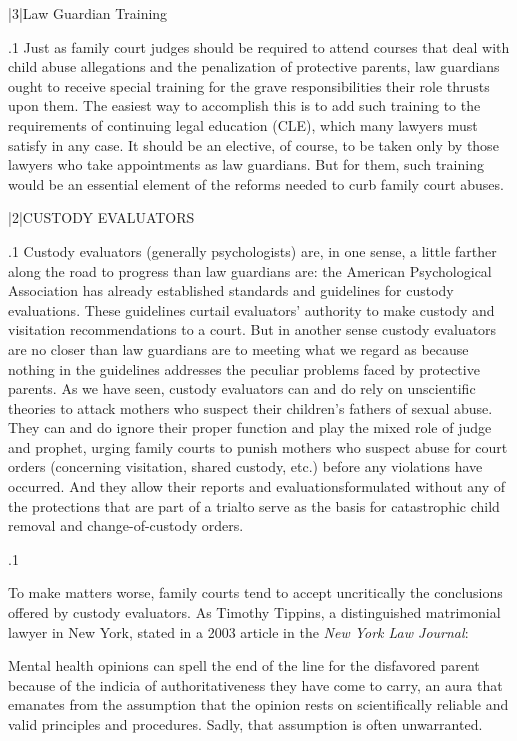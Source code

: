 \documentclass[11pt, twoside]{article}
\begin{document}
{\s|3|{Law Guardian Training}

\p.1{%
\noindent{}Just as family court judges should be required to attend courses that
deal with child abuse allegations and the penalization of protective
parents, law guardians ought to receive special training for the grave
responsibilities their role thrusts upon them. The easiest way to accomplish this is to add such training to the requirements of continuing
legal education (CLE), which many lawyers must satisfy in any case.
It should be an elective, of course, to be taken only by those lawyers
who take appointments as law guardians. But for them, such training
would be an essential element of the reforms needed to curb family court
abuses.
}%


\s|2|{CUSTODY EVALUATORS}

\p.1{%
\noindent{}Custody evaluators (generally psychologists) are, in one sense, a
little farther along the road to progress than law guardians are: the
American Psychological Association has already established standards
and guidelines for custody evaluations. These guidelines curtail evaluators’ authority to make custody and visitation recommendations to a
court. But in another sense custody evaluators are no closer than law
guardians are to meeting what we regard as  because nothing in the guidelines addresses the peculiar problems
faced by protective parents. As we have seen, custody evaluators can
and do rely on unscientific theories to attack mothers who suspect their
children’s fathers of sexual abuse. They can and do ignore their proper
function and play the mixed role of judge and prophet, urging family
courts to punish mothers who suspect abuse for  court orders
(concerning visitation, shared custody, etc.) before any violations have
occurred. And they allow their reports and evaluations\mdash{}formulated
without any of the protections that are part of a trial\mdash{}to serve as the
basis for catastrophic child removal and change-of-custody orders.
}%

\p.1{%
To make matters worse, family courts tend to accept uncritically the
conclusions offered by custody evaluators. As Timothy
Tippins, a distinguished matrimonial lawyer in New York, stated in a 2003 article in
the \textit{New York Law Journal}:

\begin{blockQuote}
Mental health opinions can spell the end of the line for the disfavored parent because of the indicia of authoritativeness they have
come to carry, an aura that emanates from the assumption that
the opinion rests on scientifically reliable and valid principles and
procedures. Sadly, that assumption is often unwarranted.
\end{blockQuote}

}}
\end{document}
